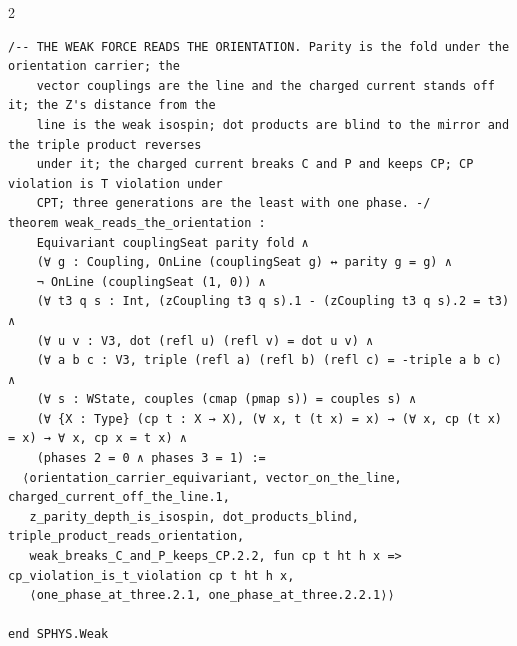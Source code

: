 \documentclass[10pt]{article}
\begin{document}
\begin{multicols}{2}
\begin{Verbatim}[fontsize=\fontsize{6.2}{7.2}\selectfont,breaklines,breakanywhere,breaksymbolleft={}]
/-- THE WEAK FORCE READS THE ORIENTATION. Parity is the fold under the orientation carrier; the
    vector couplings are the line and the charged current stands off it; the Z's distance from the
    line is the weak isospin; dot products are blind to the mirror and the triple product reverses
    under it; the charged current breaks C and P and keeps CP; CP violation is T violation under
    CPT; three generations are the least with one phase. -/
theorem weak_reads_the_orientation :
    Equivariant couplingSeat parity fold ∧
    (∀ g : Coupling, OnLine (couplingSeat g) ↔ parity g = g) ∧
    ¬ OnLine (couplingSeat (1, 0)) ∧
    (∀ t3 q s : Int, (zCoupling t3 q s).1 - (zCoupling t3 q s).2 = t3) ∧
    (∀ u v : V3, dot (refl u) (refl v) = dot u v) ∧
    (∀ a b c : V3, triple (refl a) (refl b) (refl c) = -triple a b c) ∧
    (∀ s : WState, couples (cmap (pmap s)) = couples s) ∧
    (∀ {X : Type} (cp t : X → X), (∀ x, t (t x) = x) → (∀ x, cp (t x) = x) → ∀ x, cp x = t x) ∧
    (phases 2 = 0 ∧ phases 3 = 1) :=
  ⟨orientation_carrier_equivariant, vector_on_the_line, charged_current_off_the_line.1,
   z_parity_depth_is_isospin, dot_products_blind, triple_product_reads_orientation,
   weak_breaks_C_and_P_keeps_CP.2.2, fun cp t ht h x => cp_violation_is_t_violation cp t ht h x,
   ⟨one_phase_at_three.2.1, one_phase_at_three.2.2.1⟩⟩

end SPHYS.Weak


\end{Verbatim}
\end{multicols}
\end{document}
